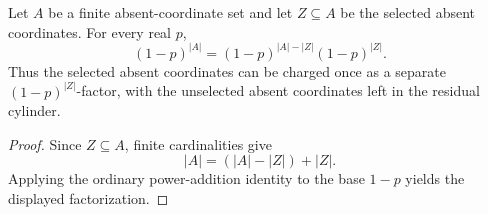 \begin{helper}
Let \(A\) be a finite absent-coordinate set and let \(Z\subseteq A\) be the
selected absent coordinates.  For every real \(p\),
\[
(1-p)^{|A|}
  =
(1-p)^{|A|-|Z|}(1-p)^{|Z|}.
\]
Thus the selected absent coordinates can be charged once as a separate
\((1-p)^{|Z|}\)-factor, with the unselected absent coordinates left in the
residual cylinder.
\end{helper}
\begin{proof}
Since \(Z\subseteq A\), finite cardinalities give
\[
|A|=(|A|-|Z|)+|Z|.
\]
Applying the ordinary power-addition identity to the base \(1-p\) yields the
displayed factorization.
\end{proof}
